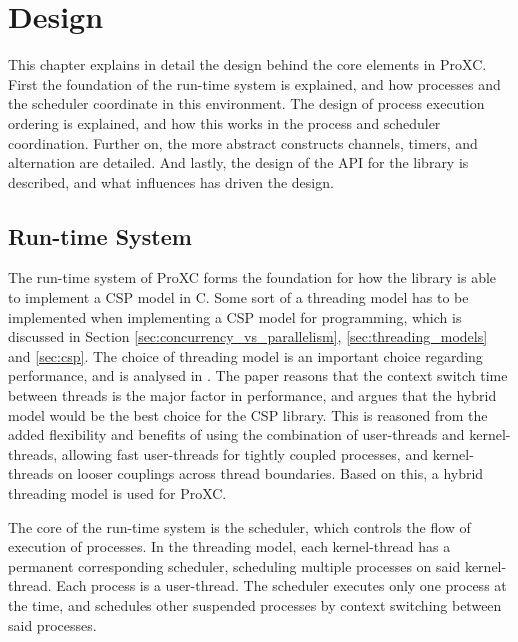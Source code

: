 
\chapter{Design}
\label{ch:design}

This chapter explains in detail the design behind the core elements in ProXC. First the foundation of the run\hyp{}time system is explained, and how processes and the scheduler coordinate in this environment. The design of process execution ordering is explained, and how this works in the process and scheduler coordination. Further on, the more abstract constructs channels, timers,  and alternation are detailed. And lastly, the design of the API for the library is described, and what influences has driven the design. 


\section{Run\hyp{}time System}
\label{sec:runtime_system}

The run\hyp{}time system of ProXC forms the foundation for how the library is able to implement a CSP model in C. Some sort of a threading model has to be implemented when implementing a CSP model for programming, which is discussed in Section \ref{sec:concurrency_vs_parallelism}, \ref{sec:threading_models} and \ref{sec:csp}. The choice of threading model is an important choice regarding performance, and is analysed in \citet[chapter 1]{c++csp2}. The paper reasons that the context switch time between threads is the major factor in performance, and argues that the hybrid model would be the best choice for the CSP library. This is reasoned from the added flexibility and benefits of using the combination of user\hyp{}threads and kernel\hyp{}threads, allowing fast user\hyp{}threads for tightly coupled processes, and kernel\hyp{}threads on looser couplings across thread boundaries. Based on this, a hybrid threading model is used for ProXC. 

The core of the run\hyp{}time system is the scheduler, which controls the flow of execution of processes. In the threading model, each kernel\hyp{}thread has a permanent corresponding scheduler, scheduling multiple processes on said kernel\hyp{}thread. Each process is a user\hyp{}thread. The scheduler executes only one process at the time, and schedules other suspended processes by context switching between said processes.

